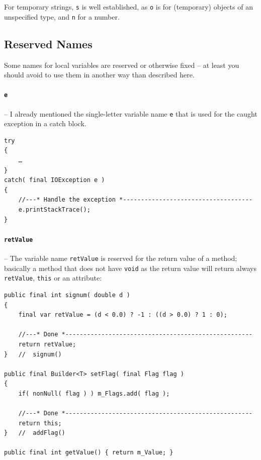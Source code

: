 For temporary strings, \lstinline|s| is well established, as \lstinline|o| is for (temporary) objects of an unspecified type, and \lstinline|n| for a number.


\subsection{Reserved Names}
Some names for local variables are reserved or otherwise fixed – at least you should avoid to use them in another way than described here.

\paragraph{\lstinline|e|}\label{lbl:e}– I already mentioned the single-letter variable name \lstinline|e| that is used for the caught exception in a catch block.
\begin{lstlisting}
try
{
    …
}
catch( final IOException e )
{
    //---* Handle the exception *------------------------------------
    e.printStackTrace();
}    
\end{lstlisting}

\paragraph{\lstinline|retValue|}\label{lbl:RetValue}– The variable name \lstinline|retValue| is reserved for the return value of a method; basically a method that does not have \lstinline|void| as the return value will return always \lstinline|retValue|, \lstinline|this| or an attribute:
\begin{lstlisting}
public final int signum( double d )
{
    final var retValue = (d < 0.0) ? -1 : ((d > 0.0) ? 1 : 0);

    //---* Done *----------------------------------------------------
    return retValue;
}   //  signum()

public final Builder<T> setFlag( final Flag flag )
{
    if( nonNull( flag ) ) m_Flags.add( flag );
    
    //---* Done *----------------------------------------------------
    return this;
}   //  addFlag()

public final int getValue() { return m_Value; }
\end{lstlisting}


